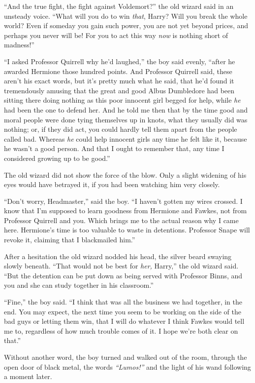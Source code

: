 ``And the true fight, the fight against Voldemort?'' the old wizard said
in an unsteady voice. ``What will you do to win \emph{that}, Harry? Will
you break the whole world? Even if someday you gain such power, you are
not yet beyond prices, and perhaps you never will be! For you to act
this way \emph{now} is nothing short of madness!''

``I asked Professor Quirrell why he'd laughed,'' the boy said evenly,
``after he awarded Hermione those hundred points. And Professor Quirrell
said, these aren't his exact words, but it's pretty much what he said,
that he'd found it tremendously amusing that the great and good Albus
Dumbledore had been sitting there doing nothing as this poor innocent
girl begged for help, while \emph{he} had been the one to defend her.
And he told me then that by the time good and moral people were done
tying themselves up in knots, what they usually did was nothing; or, if
they did act, you could hardly tell them apart from the people called
bad. Whereas \emph{he} could help innocent girls any time he felt like
it, because he wasn't a good person. And that I ought to remember that,
any time I considered growing up to be good.''

The old wizard did not show the force of the blow. Only a slight
widening of his eyes would have betrayed it, if you had been watching
him very closely.

``Don't worry, Headmaster,'' said the boy. ``I haven't gotten my wires
crossed. I know that I'm supposed to learn goodness from Hermione and
Fawkes, not from Professor Quirrell and you. Which brings me to the
actual reason why I came here. Hermione's time is too valuable to waste
in detentions. Professor Snape will revoke it, claiming that I
blackmailed him.''

After a hesitation the old wizard nodded his head, the silver beard
swaying slowly beneath. ``That would not be best for \emph{her,}
Harry,'' the old wizard said. ``But the detention can be put down as
being served with Professor Binns, and you and she can study together in
his classroom.''

``Fine,'' the boy said. ``I think that was all the business we had
together, in the end. You may expect, the next time you seem to be
working on the side of the bad guys or letting them win, that I will do
whatever I think Fawkes would tell me to, regardless of how much trouble
comes of it. I hope we're both clear on that.''

Without another word, the boy turned and walked out of the room, through
the open door of black metal, the words \emph{``Lumos!''} and the light
of his wand following a moment later.

